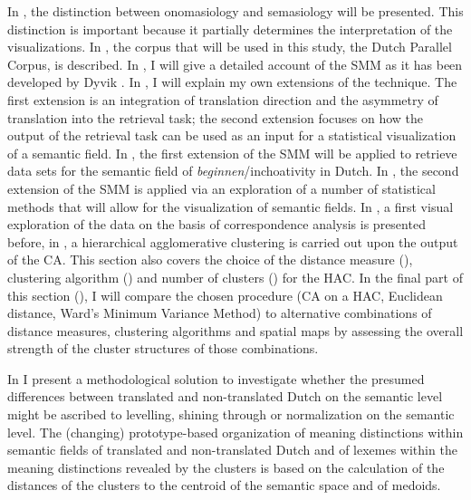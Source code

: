 In , the distinction between onomasiology and semasiology will be presented. This distinction is important because it partially determines the interpretation of the visualizations. In , the corpus that will be used in this study, the Dutch Parallel Corpus, is described. In , I will give a detailed account of the SMM as it has been developed by Dyvik \citep{johansson_translational_1998,langemets_translations_2005}. In , I will explain my own extensions of the technique. The first extension is an integration of translation direction and the asymmetry of translation into the retrieval task; the second extension focuses on how the output of the retrieval task can be used as an input for a statistical visualization of a semantic field. In , the first extension of the SMM will be applied to retrieve data sets for the semantic field of \textit{beginnen}/inchoativity in Dutch. In , the second extension of the SMM is applied via an exploration of a number of statistical methods that will allow for the visualization of semantic fields. In , a first visual exploration of the data on the basis of correspondence analysis is presented before, in , a hierarchical agglomerative clustering is carried out upon the output of the CA. This section also covers the choice of the distance measure (), clustering algorithm () and number of clusters () for the HAC. In the final part of this section (), I will compare the chosen procedure (CA on a HAC, Euclidean distance, Ward’s Minimum Variance Method) to alternative combinations of distance measures, clustering algorithms and spatial maps by assessing the overall strength of the cluster structures of those combinations.

In  I present a methodological solution to investigate whether the presumed differences between translated and non-translated Dutch on the semantic level might be ascribed to levelling, shining through or normalization on the semantic level. The (changing) prototype-based organization of meaning distinctions within semantic fields of translated and non-translated Dutch and of lexemes within the meaning distinctions revealed by the clusters is based on the calculation of the distances of the clusters to the centroid of the semantic space and of medoids.

